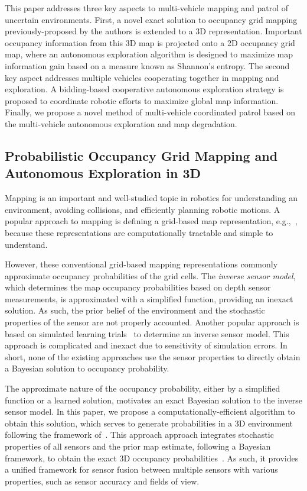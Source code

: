 \documentclass[smallextended]{svjour3}       %
\begin{document}
This paper addresses three key aspects to multi-vehicle mapping and patrol of uncertain environments. First, a novel exact solution to occupancy grid mapping previously-proposed by the authors is extended to a 3D representation. Important occupancy information from this 3D map is projected onto a 2D occupancy grid map, where an autonomous exploration algorithm is designed to maximize map information gain based on a measure known as Shannon's entropy. The second key aspect addresses multiple vehicles cooperating together in mapping and exploration. A bidding-based cooperative autonomous exploration strategy is proposed to coordinate robotic efforts to maximize global map information. Finally, we propose a novel method of multi-vehicle coordinated patrol based on the multi-vehicle autonomous exploration and map degradation.

\subsection{Probabilistic Occupancy Grid Mapping and Autonomous Exploration in 3D}

Mapping is an important and well-studied topic in robotics for understanding an environment, avoiding collisions, and efficiently planning robotic motions.
A popular approach to mapping is defining a grid-based map representation, e.g.,~\cite{WolSuk05,MeyBeiBur12,TanThoWolBus14}, because these representations are computationally tractable and simple to understand.

However, these conventional grid-based mapping representations commonly approximate occupancy probabilities of the grid cells. The \emph{inverse sensor model}, which determines the map occupancy probabilities based on depth sensor measurements, is approximated with a simplified function, providing an inexact solution. As such, the prior belief of the environment and the stochastic properties of the sensor are not properly accounted. Another popular approach is based on simulated learning trials~\cite{Thr01,ThrBurFox05,SouMaiGon12} to determine an inverse sensor model. This approach is complicated and inexact due to sensitivity of simulation errors. In short, none of the existing approaches use the sensor properties to directly obtain a Bayesian solution to occupancy probability.

The approximate nature of the occupancy probability, either by a simplified function or a learned solution, motivates an exact Bayesian solution to the inverse sensor model. In this paper, we propose a computationally-efficient algorithm to obtain this solution, which serves to generate probabilities in a 3D environment following the framework of~\cite{KauLeeAiMos16,KauTakAiLee17}. This approach approach integrates stochastic properties of all sensors and the prior map estimate, following a Bayesian framework, to obtain the exact 3D occupancy probabilities~\cite{KauTakAiLee18}. As such, it provides a unified framework for sensor fusion between multiple sensors with various properties, such as sensor accuracy and fields of view. 
\end{document}
